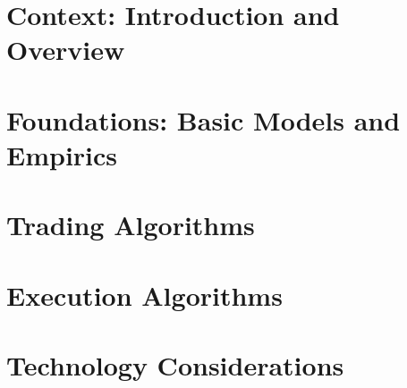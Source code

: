 \documentclass[krantz1,ChapterTOCs]{style/krantz}
\begin{document}
\raggedbottom

\frontmatter
\setcounter{page}{0}



\cleardoublepage
\tableofcontents



\mainmatter

\setcounter{part}{-1}
\part{Context: Introduction and Overview}




\part{Foundations: Basic Models and Empirics}





\part{Trading Algorithms}





\part{Execution Algorithms}





\part{Technology Considerations}



%
%




\end{document}
